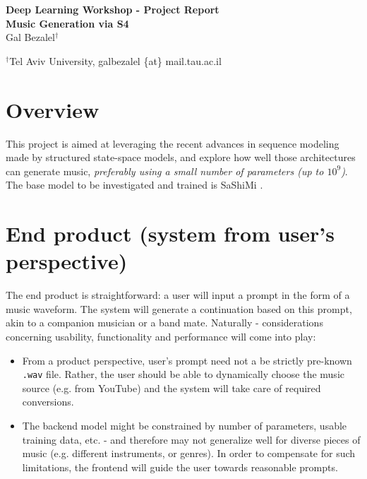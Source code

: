 \documentclass[12pt]{article}
\begin{document}
\baselineskip 12pt

\begin{center}
\textbf{\Large Deep Learning Workshop - Project Report} \\
\textbf{\Large Music Generation via S4} \\
\vspace{1.6cc}
{ \sc Gal Bezalel$^{\dagger}$}\\

\vspace{0.3 cm}

{\small $^{\dagger}$Tel Aviv University, galbezalel \{at\} mail.tau.ac.il}
 \end{center}
\vspace{1.6cc}

\section{Overview} \label{form}
This project is aimed at leveraging the recent advances in sequence modeling made by structured state-space models, 
and explore how well those architectures can generate music, \textit{preferably using a small number of parameters  (up to $10^{9}$)}. 
The base model to be investigated and trained is SaShiMi \cite{goel2022itsrawaudiogeneration}.

\section{End product (system from user’s perspective)}
The end product is straightforward: a user will input a prompt in the form of a music waveform. The system will generate a continuation based on this prompt, akin to a companion musician or a band mate. 
Naturally - considerations concerning usability, functionality and performance will come into play:
\begin{itemize}
    \item From a product perspective, user's prompt need not a be strictly pre-known \texttt{.wav} file. Rather, the user should be able to dynamically choose the music source (e.g. from YouTube) and the system will take care of required conversions.
    \item The backend model might be constrained by number of parameters, usable training data, etc. - and therefore may not generalize well for diverse pieces of music (e.g. different instruments, or genres). In order to compensate for such limitations, the frontend will guide the user towards reasonable prompts.
\end{itemize}
\end{document}

